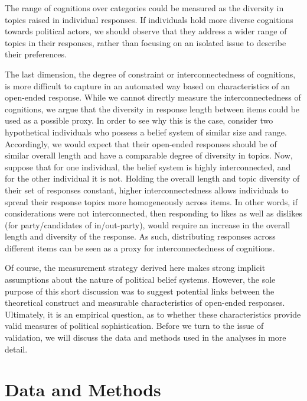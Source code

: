 \documentclass[12pt]{article}
\begin{document}
The range of cognitions over categories could be measured as the diversity in topics raised in individual responses. If individuals hold more diverse cognitions towards political actors, we should observe that they address a wider range of topics in their responses, rather than focusing on an isolated issue to describe their preferences.

The last dimension, the degree of constraint or interconnectedness of cognitions, is more difficult to capture in an automated way based on characteristics of an open-ended response. While we cannot directly measure the interconnectedness of cognitions, we argue that the diversity in response length between items could be used as a possible proxy. In order to see why this is the case, consider two hypothetical individuals who possess a belief system of similar size and range. Accordingly, we would expect that their open-ended responses should be of similar overall length and have a comparable degree of diversity in topics. Now, suppose that for one individual, the belief system is highly interconnected, and for the other individual it is not. Holding the overall length and topic diversity of their set of responses constant, higher interconnectedness allows individuals to spread their response topics more homogeneously across items. In other words, if considerations were not interconnected, then responding to likes as well as dislikes (for party/candidates of in/out-party), would require an increase in the overall length and diversity of the response. As such, distributing responses across different items can be seen as a proxy for interconnectedness of cognitions.

Of course, the measurement strategy derived here makes strong implicit assumptions about the nature of political belief systems. However, the sole purpose of this short discussion was to suggest potential links between the theoretical construct and measurable characteristics of open-ended responses. Ultimately, it is an empirical question, as to whether these characteristics provide valid measures of political sophistication. Before we turn to the issue of validation, we will discuss the data and methods used in the analyses in more detail.



\section{Data and Methods}
\end{document}
